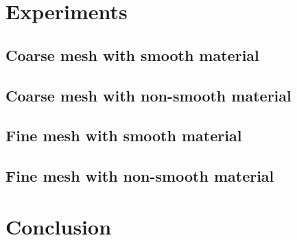 \documentclass[9pt,twocolumn]{extarticle}
\begin{document}
\section{Experiments}
\subsection{Coarse mesh with smooth material}

\subsection{Coarse mesh with non-smooth material}

\subsection{Fine mesh with smooth material}

\subsection{Fine mesh with non-smooth material}

\section{Conclusion}
\end{document}
